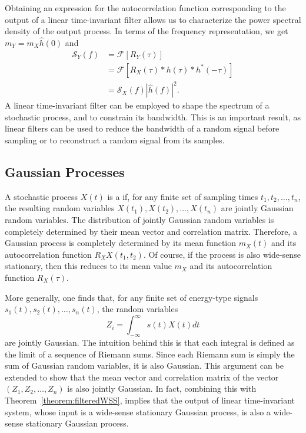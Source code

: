 Obtaining an expression for the autocorrelation function corresponding to the output of a linear time-invariant filter allows us to characterize the power spectral density of the output process.
In terms of the frequency representation, we get $m_Y = m_X \hat{h}(0)$ and
\begin{equation*}
\begin{split}
\mathcal{S}_Y (f) &= \mathcal{F} [ R_Y (\tau) ] \\
&= \mathcal{F} \left[ R_X (\tau) \ast h(\tau) \ast h^*(-\tau) \right] \\
&= \mathcal{S}_X(f) | \hat{h}(f) |^2 .
\end{split}
\end{equation*}
A linear time-invariant filter can be employed to shape the spectrum of a stochastic process, and to constrain its bandwidth.
This is an important result, as linear filters can be used to reduce the bandwidth of a random signal before sampling or to reconstruct a random signal from its samples.

\subsection{Gaussian Processes}

A stochastic process $X(t)$ is a  if, for any finite set of sampling times $t_1, t_2, \ldots, t_n$, the resulting random variables $X(t_1),X(t_2),\ldots,X(t_n)$ are jointly Gaussian random variables.
The distribution of jointly Gaussian random variables is completely determined by their mean vector and correlation matrix.
Therefore, a Gaussian process is completely determined by its mean function $m_X (t)$ and its autocorrelation function $R_XX (t_1,t_2)$.
Of course, if the process is also wide-sense stationary, then this reduces to its mean value $m_X$ and its autocorrelation function $R_X (\tau)$.

More generally, one finds that, for any finite set of energy-type signals $s_1 (t), s_2 (t), \ldots , s_n (t)$, the random variables
\[ Z_i = \int_{-\infty}^{\infty} s(t) X(t) dt \]
are jointly Gaussian.
The intuition behind this is that each integral is defined as the limit of a sequence of Riemann sums.
Since each Riemann sum is simply the sum of Gaussian random variables, it is also Gaussian.
This argument can be extended to show that the mean vector and correlation matrix of the vector $(Z_1, Z_2, \ldots, Z_n)$ is also jointly Gaussian.
In fact, combining this with Theorem~\ref{theorem:filteredWSS}, implies that the output of linear time-invariant system, whose input is a wide-sense stationary Gaussian process, is also a wide-sense stationary Gaussian process. 

